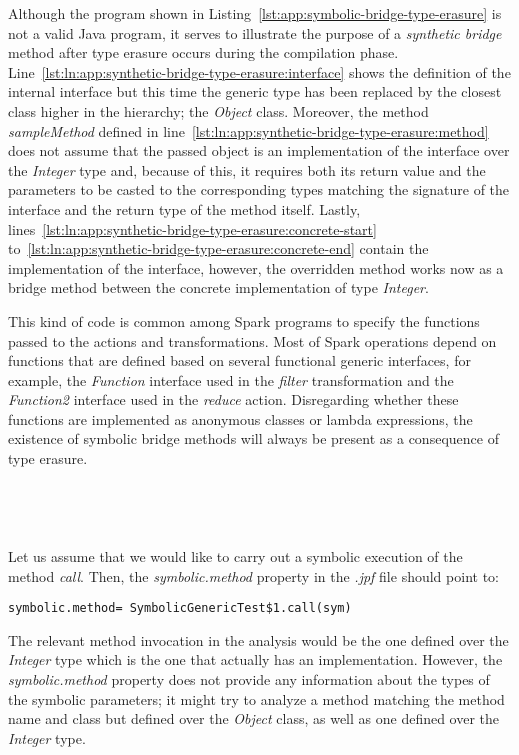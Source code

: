 Although the program shown in Listing~\ref{lst:app:symbolic-bridge-type-erasure} is not a valid Java program, it serves to illustrate the purpose of a \textit{synthetic bridge} method after type erasure occurs during the compilation phase. Line~\ref{lst:ln:app:synthetic-bridge-type-erasure:interface} shows the definition of the internal interface but this time the generic type has been replaced by the closest class higher in the hierarchy; the \textit{Object} class. Moreover, the method \textit{sampleMethod} defined in line~\ref{lst:ln:app:synthetic-bridge-type-erasure:method} does not assume that the passed object is an implementation of the interface over the \textit{Integer} type and, because of this, it requires both its return value and the parameters to be casted to the corresponding types matching the signature of the interface and the return type of the method itself. Lastly, lines~\ref{lst:ln:app:synthetic-bridge-type-erasure:concrete-start} to~\ref{lst:ln:app:synthetic-bridge-type-erasure:concrete-end} contain the implementation of the interface, however, the overridden method works now as a bridge method between the concrete implementation of type \textit{Integer}. 

This kind of code is common among Spark programs to specify the functions passed to the actions and transformations. Most of Spark operations depend on functions that are defined based on several functional generic interfaces, for example, the \textit{Function} interface used in the \textit{filter} transformation and the \textit{Function2} interface used in the \textit{reduce} action. Disregarding whether these functions are implemented as anonymous classes or lambda expressions, the existence of symbolic bridge methods will always be present as a consequence of type erasure.
\\ \\ \\ \\ \\
Let us assume that we would like \spf{} to carry out a symbolic execution of the method \textit{call}. Then, the \textit{symbolic.method} property in the \textit{.jpf} file should point to:

\hspace*{1cm} \texttt{symbolic.method= SymbolicGenericTest\$1.call(sym)}

The relevant method invocation in the analysis would be the one defined over the \textit{Integer} type which is the one that actually has an implementation. However, the \textit{symbolic.method} property does not provide any information about the types of the symbolic parameters; it might try to analyze a method matching the method name and class but defined over the \textit{Object} class, as well as one defined over the \textit{Integer} type.

